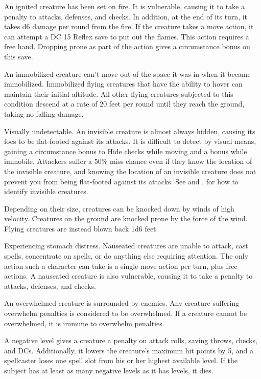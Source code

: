 An ignited creature has been set on fire. It is vulnerable, causing it to take a  penalty to attacks, defenses, and checks. In addition, at the end of its turn, it takes d6 damage per round from the fire. If the creature takes a move action, it can attempt a DC 15 Reflex save to put out the flames. This action requires a free hand. Dropping prone as part of the action gives a  circumstance bonus on this save.

 An immobilized creature can't move out of the space it was in when it became immobilized. Immobilized flying creatures that have the ability to hover can maintain their initial altitude. All other flying creatures subjected to this condition descend at a rate of 20 feet per round until they reach the ground, taking no falling damage.

 Visually undetectable. An invisible creature is almost always hidden, causing its foes to be flat-footed against its attacks. It is difficult to detect by visual means, gaining a  circumstance bonus to Hide checks while moving and a  bonus while immobile. Attackers suffer a 50\% miss chance even if they know the location of the invisible creature, and knowing the location of an invisible creature does not prevent you from being flat-footed against its attacks. See  and , for how to identify invisible creatures.

 Depending on their size, creatures can be knocked down by winds of high velocity. Creatures on the ground are knocked prone by the force of the wind. Flying creatures are instead blown back 1d6  feet.

 Experiencing stomach distress. Nauseated creatures are unable to attack, cast spells, concentrate on spells, or do anything else requiring attention. The only action such a character can take is a single move action per turn, plus free actions. A nauseated creature is also vulnerable, causing it to take a  penalty to attacks, defenses, and checks.

 An overwhelmed creature is surrounded by enemies. Any creature suffering overwhelm penalties is considered to be overwhelmed. If a creature cannot be overwhelmed, it is immune to overwhelm penalties.

 A negative level gives a creature a  penalty on attack rolls, saving throws, checks, and DCs. Additionally, it lowers the creature's maximum hit points by 5, and a spellcaster loses one spell slot from his or her highest available level. If the subject has at least as many negative levels as it has levels, it dies.

